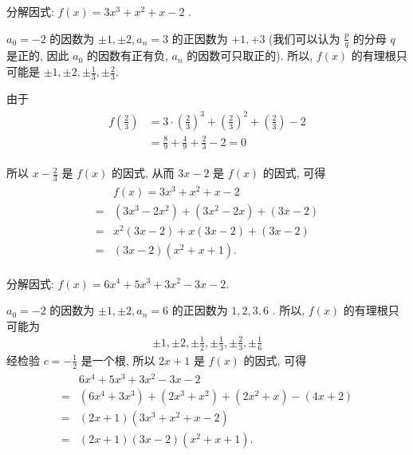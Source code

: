\begin{example}
	分解因式: $f(x)=3 x^{3}+x^{2}+x-2$ .
\end{example}
\begin{solution}
	$a_{0}=-2$ 的因数为 $\pm 1, \pm 2, a_{n}=3$ 的正因数为 $+1,+3$ (我们可以认为 $\frac{p}{q}$ 的分母 $q$ 是正的, 因此 $a_{0}$ 的因数有正有负, $a_{n}$ 的因数可只取正的). 所以,  $f(x)$ 的有理根只可能是 $\pm 1, \pm 2, \pm \frac{1}{3}, \pm \frac{2}{3}$.

	由于
	\begin{align*}
		\begin{aligned}
			f\left(\frac{2}{3}\right) & =3 \cdot\left(\frac{2}{3}\right)^{3}+\left(\frac{2}{3}\right)^{2}+\left(\frac{2}{3}\right)-2 \\
			                          & =\frac{8}{9}+\frac{4}{9}+\frac{2}{3}-2=0
		\end{aligned}
	\end{align*}

	所以 $x-\frac{2}{3}$ 是 $f(x)$ 的因式, 从而 $3 x-2$ 是 $f(x)$ 的因式, 可得
	\begin{align*}
		\begin{aligned}
			  & f(x)=3 x^{3}+x^{2}+x-2                                        \\
			= & \left(3 x^{3}-2 x^{2}\right)+\left(3 x^{2}-2 x\right)+(3 x-2) \\
			= & x^{2}(3 x-2)+x(3 x-2)+(3 x-2)                                 \\
			= & (3 x-2)\left(x^{2}+x+1\right) .
		\end{aligned}
	\end{align*}
\end{solution}

\begin{example}
	分解因式: $f(x)=6 x^{4}+5 x^{3}+3 x^{2}-3 x-2$.
\end{example}
\begin{solution}
	$a_{0}=-2$ 的因数为 $\pm 1, \pm 2, a_{n}=6$ 的正因数为 $1,2,3,6$ . 所以, $f(x)$ 的有理根只可能为
	\begin{align*}
		\pm 1, \pm 2, \pm \frac{1}{2}, \pm \frac{1}{3}, \pm \frac{2}{3}, \pm \frac{1}{6}
	\end{align*}
	经检验 $c=-\frac{1}{2}$ 是一个根, 所以 $2 x+1$ 是 $f(x)$ 的因式, 可得
	\begin{align*}
		\begin{aligned}
			  & 6 x^{4}+5 x^{3}+3 x^{2}-3 x-2                                                          \\
			= & \left(6 x^{4}+3 x^{3}\right)+\left(2 x^{3}+x^{2}\right)+\left(2 x^{2}+x\right)-(4 x+2) \\
			= & (2 x+1)\left(3 x^{3}+x^{2}+x-2\right)                                                  \\
			= & (2 x+1)(3 x-2)\left(x^{2}+x+1\right) .
		\end{aligned}
	\end{align*}
\end{solution}

